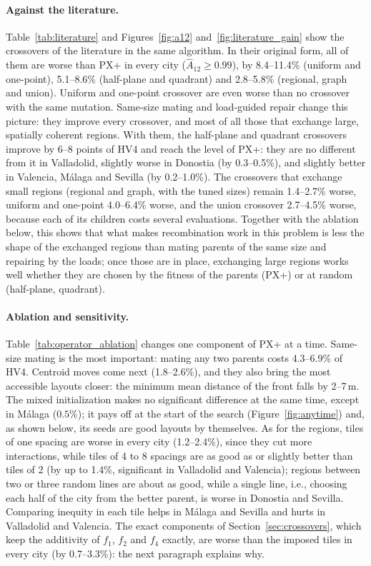 \paragraph{Against the literature.} Table~\ref{tab:literature} and Figures~\ref{fig:a12} and~\ref{fig:literature_gain} show the crossovers of the literature in the same algorithm. In their original form, all of them are worse than PX+ in every city ($\hat{A}_{12} \geq 0.99$), by 8.4--11.4\% (uniform and one-point), 5.1--8.6\% (half-plane and quadrant) and 2.8--5.8\% (regional, graph and union). Uniform and one-point crossover are even worse than no crossover with the same mutation. Same-size mating and load-guided repair change this picture: they improve every crossover, and most of all those that exchange large, spatially coherent regions. With them, the half-plane and quadrant crossovers improve by 6--8 points of HV4 and reach the level of PX+: they are no different from it in Valladolid, slightly worse in Donostia (by 0.3--0.5\%), and slightly better in Valencia, Málaga and Sevilla (by 0.2--1.0\%). The crossovers that exchange small regions (regional and graph, with the tuned sizes) remain 1.4--2.7\% worse, uniform and one-point 4.0--6.4\% worse, and the union crossover 2.7--4.5\% worse, because each of its children costs several evaluations. Together with the ablation below, this shows that what makes recombination work in this problem is less the shape of the exchanged regions than mating parents of the same size and repairing by the loads; once those are in place, exchanging large regions works well whether they are chosen by the fitness of the parents (PX+) or at random (half-plane, quadrant).



\paragraph{Ablation and sensitivity.} Table~\ref{tab:operator_ablation} changes one component of PX+ at a time. Same-size mating is the most important: mating any two parents costs 4.3--6.9\% of HV4. Centroid moves come next (1.8--2.6\%), and they also bring the most accessible layouts closer: the minimum mean distance of the front falls by 2--7\,m. The mixed initialization makes no significant difference at the same time, except in Málaga ($0.5\%$); it pays off at the start of the search (Figure~\ref{fig:anytime}) and, as shown below, its seeds are good layouts by themselves. As for the regions, tiles of one spacing are worse in every city (1.2--2.4\%), since they cut more interactions, while tiles of 4 to 8 spacings are as good as or slightly better than tiles of 2 (by up to 1.4\%, significant in Valladolid and Valencia); regions between two or three random lines are about as good, while a single line, i.e., choosing each half of the city from the better parent, is worse in Donostia and Sevilla. Comparing inequity in each tile helps in Málaga and Sevilla and hurts in Valladolid and Valencia. The exact components of Section~\ref{sec:crossovers}, which keep the additivity of $f_1$, $f_2$ and $f_4$ exactly, are worse than the imposed tiles in every city (by 0.7--3.3\%): the next paragraph explains why.

